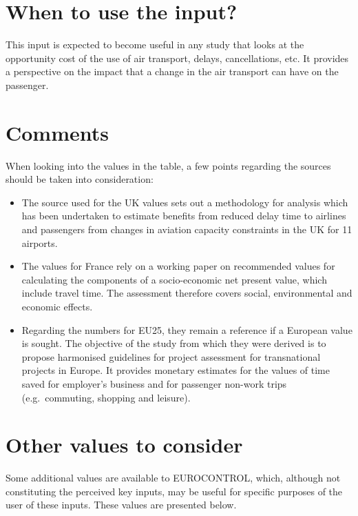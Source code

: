 \documentclass[
  11pt,
  a4paper,
]{book}
\begin{document}
\hypertarget{when-to-use-the-input-8}{%
\section{When to use the input?}\label{when-to-use-the-input-8}}

This input is expected to become useful in any study that looks at the
opportunity cost of the use of air transport, delays, cancellations,
etc. It provides a perspective on the impact that a change in the air
transport can have on the passenger.

\hypertarget{comments-13}{%
\section{Comments}\label{comments-13}}

When looking into the values in the table, a few points regarding the
sources should be taken into consideration:

\begin{itemize}
\item
  The source used for the UK values sets out a methodology for analysis
  which has been undertaken to estimate benefits from reduced delay time
  to airlines and passengers from changes in aviation capacity
  constraints in the UK for 11 airports.
\item
  The values for France rely on a working paper on recommended values
  for calculating the components of a socio-economic net present value,
  which include travel time. The assessment therefore covers social,
  environmental and economic effects.
\item
  Regarding the numbers for EU25, they remain a reference if a European
  value is sought. The objective of the study from which they were
  derived is to propose harmonised guidelines for project assessment for
  transnational projects in Europe. It provides monetary estimates for
  the values of time saved for employer's business and for passenger
  non-work trips (e.g.~commuting, shopping and leisure).
\end{itemize}

\hypertarget{other-values-to-consider}{%
\section{Other values to consider}\label{other-values-to-consider}}

Some additional values are available to EUROCONTROL, which, although not
constituting the perceived key inputs, may be useful for specific
purposes of the user of these inputs. These values are presented below.
\end{document}
